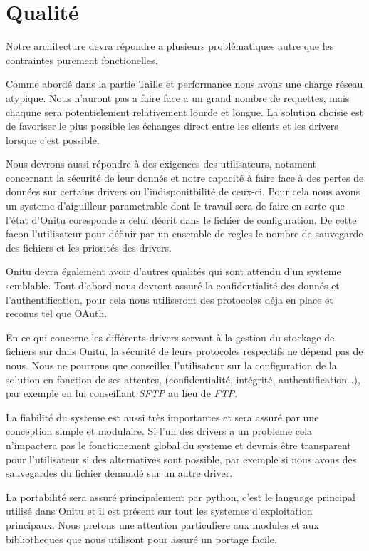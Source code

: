 \chapter{Qualité}
\thispagestyle{EIP} %

Notre architecture devra répondre a plusieurs problématiques autre que les contraintes purement fonctionelles.

Comme abordé dans la partie Taille et performance nous avons une charge réseau atypique. Nous n'auront pas a faire face a un grand nombre de requettes, mais chaqune sera potentielement relativement lourde et longue. La solution choisie est de favoriser le plus possible les échanges direct entre les clients et les drivers lorsque c'est possible.

Nous devrons aussi répondre à des exigences des utilisateurs, notament concernant la sécurité de leur donnés et notre capacité à faire face à des pertes de données sur certains drivers ou l'indisponitbilité de ceux-ci. Pour cela nous avons un systeme d'aiguilleur parametrable dont le travail sera de faire en sorte que l'état d'Onitu coresponde a celui décrit dans le fichier de configuration. De cette facon l'utilisateur pour définir par un ensemble de regles le nombre de sauvegarde des fichiers et les priorités des drivers.

Onitu devra également avoir d'autres qualités qui sont attendu d'un systeme semblable. Tout d'abord nous devront assuré la confidentialité des donnés et l'authentification, pour cela nous utiliseront des protocoles déja en place et reconus tel que OAuth.

En ce qui concerne les différents drivers servant à la gestion du stockage de fichiers sur dans  Onitu, la sécurité de leurs protocoles respectifs ne dépend pas de nous. Nous ne pourrons que conseiller l'utilisateur sur la configuration de la solution en fonction de ses attentes, (confidentialité, intégrité, authentification…), par exemple en lui conseillant \textit{SFTP} au lieu de \textit{FTP}.

La fiabilité du systeme est aussi très importantes et sera assuré par une conception simple et modulaire. Si l'un des drivers a un probleme cela n'impactera pas le fonctionement global du systeme et devrais être transparent pour l'utilisateur si des alternatives sont possible, par exemple si nous avons des sauvegardes du fichier demandé sur un autre driver.

La portabilité sera assuré principalement par python, c'est le language principal utilisé dans Onitu et il est présent sur tout les systemes d'exploitation principaux. Nous pretons une attention particuliere aux modules et aux bibliotheques que nous utilisont pour assuré un portage facile.
